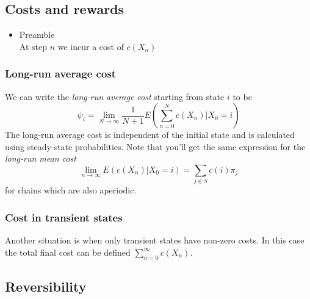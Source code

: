 \documentclass[11pt,a4paper]{article}
\begin{document}
\subsection{Costs and rewards}

\begin{itemize}
    \item Preamble \\
        At step $n$ we incur a cost of $c(X_n)$
\end{itemize}

\subsubsection{Long-run average cost}

We can write the \emph{long-run average cost} starting from state $i$ to be
\[
    \psi_i = \lim_{N \to \infty} \frac{1}{N+1} E\left( \sum_{n=0}^N c(X_n) | X_0 = i \right)
\]
The long-run average cost is independent of the initial state and is calculated using steady-state probabilities.
Note that you'll get the same expression for the \emph{long-run mean cost}
\[
    \lim_{n \to \infty} E(c(X_n)|X_0=i) = \sum_{j \in S}c(i)\pi_j
\]
for chains which are also aperiodic.

\subsubsection{Cost in transient states}
Another situation is when only transient states have non-zero costs.
In this case the total final cost can be defined $\sum_{n=0}^\infty c(X_n)$.

\subsection{Reversibility}
\end{document}
